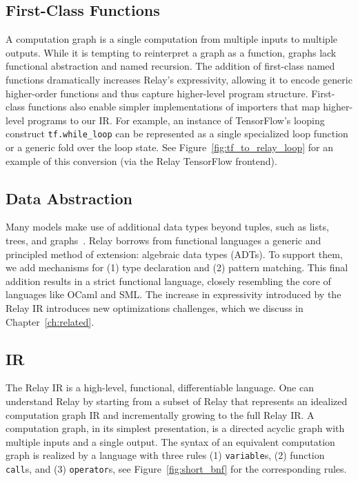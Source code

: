 \subsection*{First-Class Functions}

A computation graph is a single computation
  from multiple inputs to multiple outputs.
While it is tempting to reinterpret a graph as a function,
  graphs lack functional abstraction and named recursion.
The addition of first-class named functions dramatically increases
  Relay's expressivity, allowing it to encode generic
  higher-order functions and thus capture higher-level program structure.
First-class functions also enable simpler implementations
  of importers that map higher-level programs to our IR.
For example, an instance of TensorFlow's looping construct \verb|tf.while_loop|
  can be represented as a single specialized loop function
  or a generic fold over the loop state.
See Figure~\ref{fig:tf_to_relay_loop} for an example of this conversion (via
  the Relay TensorFlow frontend).

\subsection*{Data Abstraction}
Many models make use of additional data types beyond
  tuples, such as lists, trees, and graphs~\citep{char-rnn, tree_lstm, graph_lstm}.
Relay borrows from functional languages
  a generic and principled method of extension:
  algebraic data types (ADTs).
To support them, we add mechanisms for
  (1) type declaration and
  (2) pattern matching.
This final addition results in a strict functional language,
  closely resembling the core of languages like OCaml and SML.
The increase in expressivity introduced by the Relay IR introduces
  new optimizations challenges, which we
  discuss in Chapter~\ref{ch:related}.


  \subsection{IR}
  

  The Relay IR is a high-level, functional, differentiable language.
  One can understand Relay by starting from a subset of Relay
    that represents an idealized computation graph IR and
    incrementally growing to the full Relay IR.
  A computation graph, in its simplest presentation, is a directed acyclic
    graph with multiple inputs and a single output.
  The syntax of an equivalent computation graph is realized by
    a language with three rules (1) \verb|variable|s, (2) function \verb|call|s,
    and (3) \verb|operator|s, see Figure~\ref{fig:short_bnf} for the corresponding rules.

